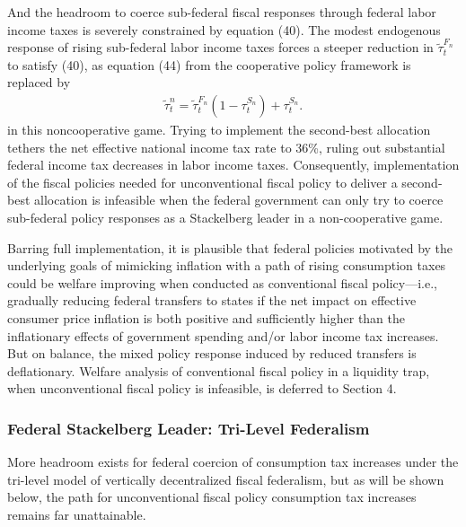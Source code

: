 \documentclass[12pt,letterpaper]{article}
\begin{document}
And the headroom to coerce sub-federal fiscal responses through federal labor income taxes is severely constrained by equation (40). The modest endogenous response of rising sub-federal labor income taxes forces a steeper reduction in $\tilde{\tau}^{F_n}_t$ to satisfy (40), as equation (44) from the cooperative policy framework is replaced by
\begin{align} \tilde{\tau}_t^n =  \tilde{\tau}^{F_n}_t (1 -  {\tau}^{S_n}_t) + {\tau}^{S_n}_t.
\end{align} 
in this noncooperative game. Trying to implement the second-best allocation tethers the net effective national income tax rate to 36\%, ruling out substantial federal income tax decreases in labor income taxes. Consequently, implementation of the fiscal policies needed for unconventional fiscal policy to deliver a second-best allocation is infeasible when the federal government can only try to coerce sub-federal policy responses as a Stackelberg leader in a non-cooperative game. 

Barring full implementation, it is plausible that federal policies motivated by the underlying goals of mimicking inflation with a path of rising consumption taxes could be welfare improving when conducted as conventional fiscal policy---i.e., gradually reducing federal transfers to states if the net impact on effective consumer price inflation is both positive and sufficiently higher than the inflationary effects of government spending and/or labor income tax increases. But on balance, the mixed policy response induced by reduced transfers is deflationary. Welfare analysis of conventional fiscal policy in a liquidity trap, when unconventional fiscal policy is infeasible, is deferred to Section 4. 

\subsubsection{Federal Stackelberg Leader: Tri-Level Federalism}

More headroom exists for federal coercion of consumption tax increases under the tri-level model of vertically decentralized fiscal federalism, but as will be shown below, the path for unconventional fiscal policy consumption tax increases remains far unattainable.
\end{document}
